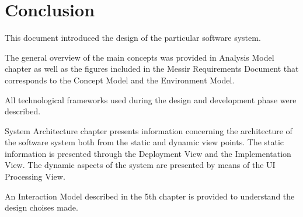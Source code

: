\chapter{Conclusion}
\label{chap:final_conclusion}

This document introduced the design of the particular software system.

The general overview of the main concepts was provided in Analysis Model
chapter as well as the figures included in the Messir Requirements Document
that corresponds to the Concept Model and the Environment Model.

All technological frameworks used during the design and development phase were
described.

System Architecture chapter presents information concerning the architecture of
the software system both from the static and dynamic view points. The static
information is presented through the Deployment View and the Implementation
View. The dynamic aspects of the system are presented by means of the UI Processing View.

An Interaction Model described in the 5th chapter is provided to understand the
design choises made.
